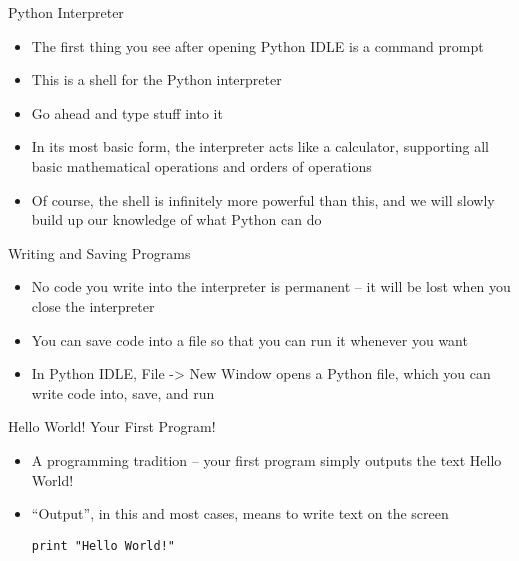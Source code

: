 \begin{frame}{Python Interpreter}
\begin{itemize}
\item The first thing you see after opening Python IDLE is a command prompt
\item This is a shell for the Python interpreter
\item Go ahead and type stuff into it
\item In its most basic form, the interpreter acts like a calculator, supporting all basic mathematical operations and orders of operations
\item Of course, the shell is infinitely more powerful than this, and we will slowly build up our knowledge of what Python can do
\end{itemize}
\end{frame}

\begin{frame}{Writing and Saving Programs}
\begin{itemize}
\item No code you write into the interpreter is permanent -- it will be lost when you close the interpreter
\item You can save code into a file so that you can run it whenever you want
\item In Python IDLE, File -> New Window opens a Python file, which you can write code into, save, and run
\end{itemize}
\end{frame}

\begin{frame}[fragile]{Hello World! Your First Program!}
\begin{itemize}
\item A programming tradition -- your first program simply outputs the text {\ttfamily Hello World!}
\item ``Output'', in this and most cases, means to write text on the screen
\begin{lstlisting}
print "Hello World!"
\end{lstlisting}
\end{itemize}
\end{frame}



